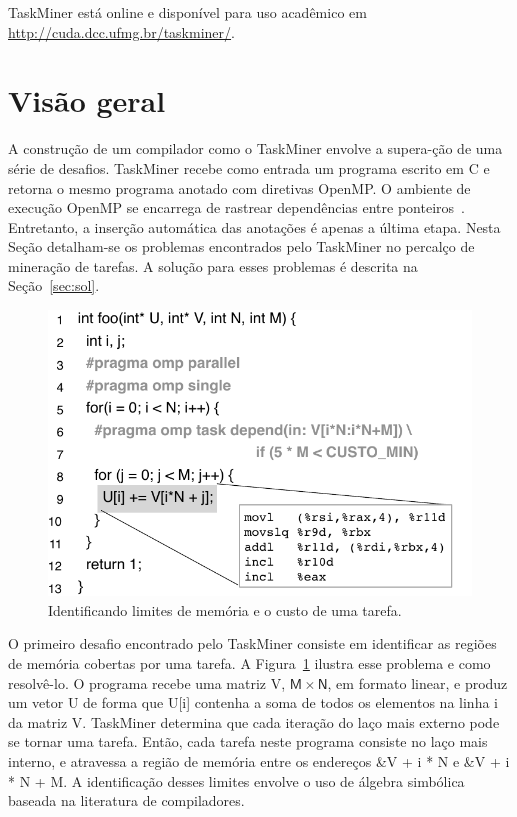 \documentclass[sigconf]{acmart}
\newcommand\Taskminer{\mbox{\textsf{TaskMiner}}}
\begin{document}
\Taskminer{} está online e disponível para uso acadêmico em \url{http://cuda.dcc.ufmg.br/taskminer/}.


\section{Visão geral}
\label{sec:ovf}

A construção de um compilador como o \Taskminer{} envolve a supera-ção de uma série  de desafios.
\Taskminer{} recebe como entrada um programa escrito em C e retorna o mesmo programa anotado com 
diretivas OpenMP. O ambiente de execução OpenMP se encarrega de 
rastrear dependências entre ponteiros~\cite{LaGrone11}. Entretanto, a inserção
automática das anotações é apenas a última etapa. Nesta Seção detalham-se os problemas
encontrados pelo \Taskminer{} no percalço de mineração de tarefas. A solução para esses problemas é descrita na Seção~\ref{sec:sol}.

\begin{figure}[b!]
\begin{center}
\includegraphics[width=1\columnwidth]{images/ex_Regions}
\caption{Identificando limites de memória e o custo de uma tarefa.}
\label{fig:ex_Regions}
\end{center}
\end{figure}

O primeiro desafio encontrado pelo \Taskminer{} consiste em 
identificar as regiões de memória cobertas por uma tarefa.
A Figura~\ref{fig:ex_Regions} ilustra esse problema e como resolvê-lo. O programa
recebe uma matriz \textsf{V}, $\mathsf{M}\times\mathsf{N}$, em formato linear,
e produz um vetor  \textsf{U} de forma que  \textsf{U[i]} contenha a soma de todos
os elementos na linha  \textsf{i} da matriz  \textsf{V}. {\Taskminer} determina que cada
iteração do laço mais externo pode se tornar uma tarefa. Então, cada tarefa neste programa
consiste no laço mais interno, e atravessa a região de memória entre os endereços  \textsf{\&V + i * N} e
 \textsf{\&V + i * N + M}. A identificação desses limites envolve o uso de álgebra simbólica baseada
 na literatura de compiladores.
 
\end{document}
